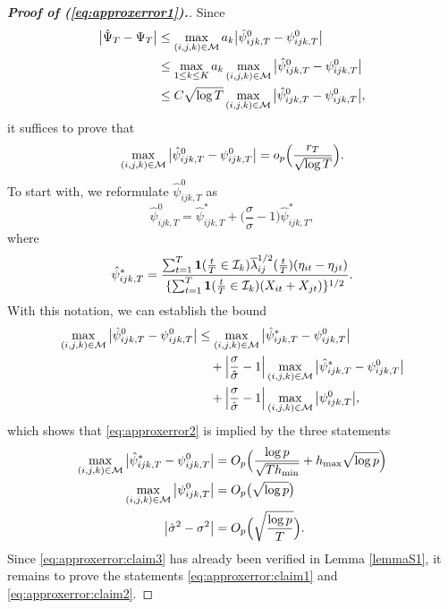 \documentclass[a4paper,12pt]{article}
\numberwithin{equation}{section}
\begin{document}
\begin{proof}[\textnormal{\textbf{Proof of (\ref{eq:approxerror1}).}}] 
Since 
\begin{align*}
\big| \hat{\Psi}_T - \Psi_T \big| 
 & \le \max_{(i,j,k) \in \mathcal{M}} a_k \big| \hat{\psi}_{ijk,T}^0 - \psi_{ijk,T}^0 \big| \\
 & \le \max_{1 \le k \le K} a_k \max_{(i,j,k) \in \mathcal{M}} \big| \hat{\psi}_{ijk,T}^0 - \psi_{ijk,T}^0 \big| \\
 & \le C \sqrt{\log T} \max_{(i,j,k) \in \mathcal{M}} \big| \hat{\psi}_{ijk,T}^0 - \psi_{ijk,T}^0 \big|, 
\end{align*}
it suffices to prove that 
\begin{equation}\label{eq:approxerror2}
\max_{(i,j,k) \in \mathcal{M}} \big| \hat{\psi}_{ijk,T}^0 - \psi_{ijk,T}^0 \big| = o_p\Big(\frac{r_T}{\sqrt{\log T}}\Big).
\end{equation}
To start with, we reformulate $\hat{\psi}_{ijk,T}^0$ as
\[ \hat{\psi}_{ijk,T}^0 = \hat{\psi}_{ijk,T}^* + \Big( \frac{\sigma}{\hat{\sigma}} - 1 \Big) \hat{\psi}_{ijk,T}^*, \]
where 
\[ \hat{\psi}_{ijk,T}^* =  \frac{\sum\nolimits_{t=1}^T \boldsymbol{1}(\frac{t}{T} \in \mathcal{I}_k) \overline{\lambda}_{ij}^{1/2}(\frac{t}{T}) (\eta_{it} - \eta_{jt})}{ \{ \sum\nolimits_{t=1}^T \boldsymbol{1}(\frac{t}{T} \in \mathcal{I}_k) (X_{it} + X_{jt}) \}^{1/2}}. \]
With this notation, we can establish the bound 
\begin{align*}
\max_{(i,j,k) \in \mathcal{M}} \big| \hat{\psi}_{ijk,T}^0 - \psi_{ijk,T}^0 \big| 
 & \le \max_{(i,j,k) \in \mathcal{M}} \big| \hat{\psi}_{ijk,T}^* - \psi_{ijk,T}^0 \big| \\
 & \quad + \Big| \frac{\sigma}{\hat{\sigma}} - 1 \Big| \max_{(i,j,k) \in \mathcal{M}} \big| \hat{\psi}_{ijk,T}^* - \psi_{ijk,T}^0 \big| \\
 & \quad + \Big| \frac{\sigma}{\hat{\sigma}} - 1 \Big| \max_{(i,j,k) \in \mathcal{M}} \big|\psi_{ijk,T}^0\big|, 
\end{align*}
which shows that \eqref{eq:approxerror2} is implied by the three statements 
\begin{align} 
\max_{(i,j,k) \in \mathcal{M}} \big| \hat{\psi}_{ijk,T}^* - \psi_{ijk,T}^0 \big| & = O_p \Big( \frac{\log p}{\sqrt{T h_{\min}}} + h_{\max} \sqrt{\log p} \Big) \label{eq:approxerror:claim1} \\
\max_{(i,j,k) \in \mathcal{M}} \big|\psi_{ijk,T}^0\big| & = O_p\big(\sqrt{\log p}\big) \label{eq:approxerror:claim2} \\
\big| \hat{\sigma}^2 - \sigma^2 \big| & = O_p\Big( \sqrt{\frac{\log p}{T}} \Big). \label{eq:approxerror:claim3} 
\end{align}
Since \eqref{eq:approxerror:claim3} has already been verified in Lemma \ref{lemmaS1}, it remains to prove the statements \eqref{eq:approxerror:claim1} and \eqref{eq:approxerror:claim2}.



\end{proof}
\end{document}
